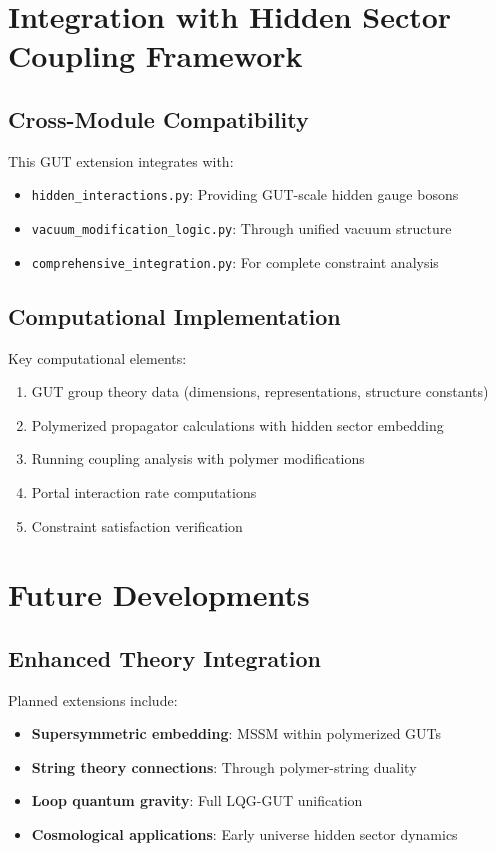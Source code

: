 \documentclass[11pt]{article}
\begin{document}
\section{Integration with Hidden Sector Coupling Framework}

\subsection{Cross-Module Compatibility}

This GUT extension integrates with:
\begin{itemize}
    \item \texttt{hidden\_interactions.py}: Providing GUT-scale hidden gauge bosons
    \item \texttt{vacuum\_modification\_logic.py}: Through unified vacuum structure
    \item \texttt{comprehensive\_integration.py}: For complete constraint analysis
\end{itemize}

\subsection{Computational Implementation}

Key computational elements:
\begin{enumerate}
    \item GUT group theory data (dimensions, representations, structure constants)
    \item Polymerized propagator calculations with hidden sector embedding
    \item Running coupling analysis with polymer modifications
    \item Portal interaction rate computations
    \item Constraint satisfaction verification
\end{enumerate}

\section{Future Developments}

\subsection{Enhanced Theory Integration}

Planned extensions include:
\begin{itemize}
    \item \textbf{Supersymmetric embedding}: MSSM within polymerized GUTs
    \item \textbf{String theory connections}: Through polymer-string duality
    \item \textbf{Loop quantum gravity}: Full LQG-GUT unification
    \item \textbf{Cosmological applications}: Early universe hidden sector dynamics
\end{itemize}
\end{document}
